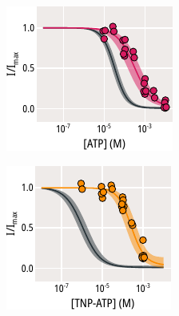 \begin{figure}[h]
	\centering
	\begin{subfigure}[t]{0.35\textwidth}
		\caption{}\label{ch6fig:nosur_atp}
		\centering
		\includegraphics[width=\textwidth]{nosur_atp.pdf}
	\end{subfigure}
	\hfill
	\begin{subfigure}[t]{0.35\textwidth}
		\caption{}\label{ch6fig:nosur_tnpatp}
		\centering
		\includegraphics[width=\textwidth]{nosur_tnpatp.pdf}

\end{subfigure}
\end{figure}
